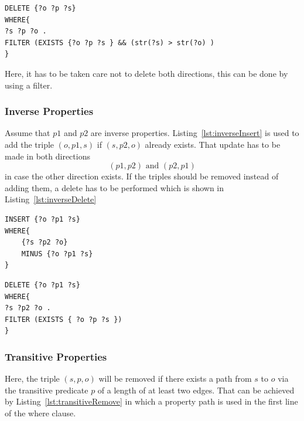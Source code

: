 \begin{lstlisting}[captionpos=b, caption=SPARQL update for removing triples with the symmetric property p., label=lst:symmetricDelete,
basicstyle=\ttfamily,frame=single,float=hbt,]
DELETE {?o ?p ?s}
WHERE{
?s ?p ?o .
FILTER (EXISTS {?o ?p ?s } && (str(?s) > str(?o) )
}
\end{lstlisting}

Here, it has to be taken care not to delete both directions, this can be done by using a filter.

\subsubsection{Inverse Properties}

Assume that $ p1 $ and $ p2 $ are inverse properties. Listing~\ref{lst:inverseInsert} is used to add the triple $(o,p1,s)$ if $(s,p2,o)$ already exists. That update has to be made in both directions  
\[
(p1,p2) \text{ and } (p2,p1)
\]
in case the other direction exists. If the triples should be removed instead of adding them, a delete has to be performed which is shown in Listing~\ref{lst:inverseDelete}

\begin{lstlisting}[captionpos=b, caption=SPARQL update for adding triples with the inverse properties p1 and p2., label=lst:inverseInsert,
basicstyle=\ttfamily,frame=single,float=hbt,]
INSERT {?o ?p1 ?s}
WHERE{
	{?s ?p2 ?o}
	MINUS {?o ?p1 ?s}
}
\end{lstlisting}



\begin{lstlisting}[captionpos=b, caption=SPARQL update for removing triples with the inverse properties p1 and p2., label=lst:inverseDelete,
basicstyle=\ttfamily,frame=single,float=hbt,]
DELETE {?o ?p1 ?s}
WHERE{
?s ?p2 ?o .
FILTER (EXISTS { ?o ?p ?s })
}
\end{lstlisting}

\subsubsection{Transitive Properties}

Here, the triple $(s,p,o)$ will be removed if there exists a path from $s$ to $o$ via the transitive predicate $p$ of a length of at least two edges. That can be achieved by Listing~\ref{lst:transitiveRemove} in which a property path is used in the first line of the where clause.

